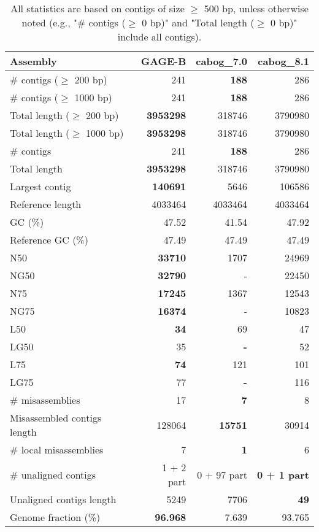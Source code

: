 \documentclass[12pt,a4paper]{article}
\begin{document}
\begin{table}[ht]
\begin{center}
\caption{All statistics are based on contigs of size $\geq$ 500 bp, unless otherwise noted (e.g., "\# contigs ($\geq$ 0 bp)" and "Total length ($\geq$ 0 bp)" include all contigs).}
\begin{tabular}{|l*{3}{|r}|}
\hline
Assembly & GAGE-B & cabog\_7.0 & cabog\_8.1 \\ \hline
\# contigs ($\geq$ 200 bp) & 241 & {\bf 188} & 286 \\ \hline
\# contigs ($\geq$ 1000 bp) & 241 & {\bf 188} & 286 \\ \hline
Total length ($\geq$ 200 bp) & {\bf 3953298} & 318746 & 3790980 \\ \hline
Total length ($\geq$ 1000 bp) & {\bf 3953298} & 318746 & 3790980 \\ \hline
\# contigs & 241 & {\bf 188} & 286 \\ \hline
Total length & {\bf 3953298} & 318746 & 3790980 \\ \hline
Largest contig & {\bf 140691} & 5646 & 106586 \\ \hline
Reference length & 4033464 & 4033464 & 4033464 \\ \hline
GC (\%) & 47.52 & 41.54 & 47.92 \\ \hline
Reference GC (\%) & 47.49 & 47.49 & 47.49 \\ \hline
N50 & {\bf 33710} & 1707 & 24969 \\ \hline
NG50 & {\bf 32790} & - & 22450 \\ \hline
N75 & {\bf 17245} & 1367 & 12543 \\ \hline
NG75 & {\bf 16374} & - & 10823 \\ \hline
L50 & {\bf 34} & 69 & 47 \\ \hline
LG50 & 35 & {\bf -} & 52 \\ \hline
L75 & {\bf 74} & 121 & 101 \\ \hline
LG75 & 77 & {\bf -} & 116 \\ \hline
\# misassemblies & 17 & {\bf 7} & 8 \\ \hline
Misassembled contigs length & 128064 & {\bf 15751} & 30914 \\ \hline
\# local misassemblies & 7 & {\bf 1} & 6 \\ \hline
\# unaligned contigs & 1 + 2 part & 0 + 97 part & {\bf 0 + 1 part} \\ \hline
Unaligned contigs length & 5249 & 7706 & {\bf 49} \\ \hline
Genome fraction (\%) & {\bf 96.968} & 7.639 & 93.765 \\ \hline

\end{tabular}
\end{center}
\end{table}
\end{document}
